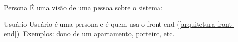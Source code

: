 \begin{siglas}
    \item[Persona] É uma visão de uma pessoa sobre o sistema: 
    \item[Usuário] Usuário é uma persona e é quem usa o front-end (\autoref{arquitetura-front-end}). Exemplos: dono de um apartamento, porteiro, etc.
\end{siglas}
